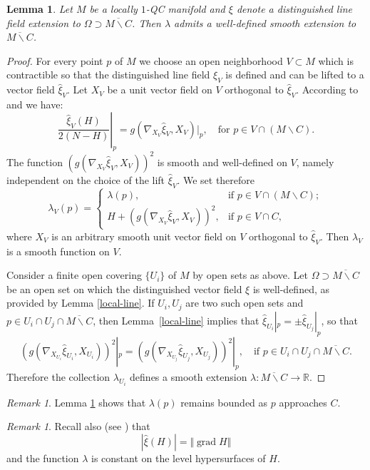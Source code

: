 \documentclass[JEP,XML,SOM,Unicode]{cedram}
\let\moins\smallsetminus
\DeclareMathOperator{\grad}{grad}
\let\parallel\Vert
\newtheorem{lemma}[theorem]{Lemma}
\theoremstyle{definition}
\theoremstyle{remark}
\newtheorem{remark}[theorem]{Remark}
\numberwithin{equation}{section}
\newcommand{\RR}{\mathbb R}
\begin{document}
\begin{lemma}\label{extension-lambda}
Let $M$ be a locally $1$-QC manifold and $\xi$ denote a distinguished line field extension to $\Omega\supset \overline{M\moins C}$.
Then $\lambda$ admits a well-defined smooth extension to $\overline{M\moins C}$.
\end{lemma}
\begin{proof}
For every point $p$ of $M$ we choose an open neighborhood $V\subset M$ which is contractible so that
the distinguished line field $\xi_V$ is defined and can be lifted to a vector field $\widehat{\xi}_V$.
Let $X_V$ be a unit vector field on $V$ orthogonal to $\widehat{\xi}_V$.
According to \hbox{\cite[(3.11)]{BP}} and \cite[(3.5)]{GM} we have:
\[\left.\frac{\widehat{\xi}_V(H)}{2(N-H)}\right|_p= g(\nabla_{X_V}\widehat{\xi}_V, X_V)|_p, \quad\text{for } p\in V\cap (M\moins C).\]
The function $(g(\nabla_{X_V}\widehat{\xi}_V, X_V))^2$ is smooth and well-defined on $V$, namely independent on the choice of the lift $\widehat{\xi}_V$. We set therefore
\[\lambda_V(p)=\begin{cases}
\lambda(p), &\text{if } p\in V\cap (M\moins C);\\
H+(g(\nabla_{X_V}\widehat{\xi}_V, X_V))^2, &\text{if } p\in V\cap C,
\end{cases}\]
where $X_V$ is an arbitrary smooth unit vector field on $V$ orthogonal to $\widehat{\xi}_V$.
Then $\lambda_V$ is a smooth function on $V$.

Consider a finite open covering $\{U_i\}$ of $M$ by open sets as above. Let $\Omega\supset \overline{M\moins C}$ be an
open set on which the distinguished vector field $\xi$ is well-defined, as provided by Lemma \ref{local-line}.
If $U_i,U_j$ are two such open sets and $p\in U_i\cap U_j\cap \overline{M\moins C}$, then Lemma~\ref{local-line} implies that
$\widehat{\xi}_{U_i}|_p=\pm\widehat{\xi}_{U_j}|_p$, so that
\[ (g(\nabla_{X_{U_i}}\widehat{\xi}_{U_i}, X_{U_i}))^2|_p= (g(\nabla_{X_{U_j}}\widehat{\xi}_{U_j}, X_{U_j}))^2|_p, \quad\text{if } p\in U_i\cap U_j \cap \overline{M\moins C}.\]
Therefore
the collection $\lambda_{U_i}$ defines a smooth extension $\lambda:\overline{M\moins C}\to \RR$.
\end{proof}
\begin{remark}
Lemma \ref{extension-lambda} shows that $\lambda(p)$ remains bounded
as $p$ approaches $C$.
\end{remark}

\begin{remark}
Recall also (see \cite{BP,GM}) that
\[ |\widehat{\xi}(H)|=\parallel \grad H\parallel \]
and the function $\lambda$ is constant on the
level hypersurfaces of $H$.
\end{remark}
\end{document}
